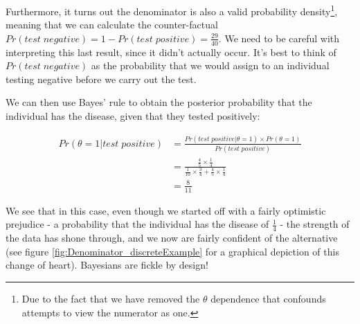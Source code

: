 \documentclass[11pt,fullpage]{book}
\begin{document}
Furthermore, it turns out the denominator is also a valid probability density\footnote{Due to the fact that we have removed the $\theta$ dependence that confounds attempts to view the numerator as one.}, meaning that we can calculate the counter-factual $Pr(test\; negative) = 1 - Pr(test\; positive) = \frac{29}{40}$. We need to be careful with interpreting this last result, since it didn't actually occur. It's best to think of $Pr(test\; negative)$ as the probability that we would assign to an individual testing negative before we carry out the test.

We can then use Bayes' rule to obtain the posterior probability that the individual has the disease, given that they tested positively:

\begin{align}\label{eq:Denominator_discreteExamplePosterior}
Pr(\theta=1|test\; positive) &= \frac{Pr(test\; positive|\theta=1)\times Pr(\theta=1)}{Pr(test\; positive)}\\
&= \frac{\frac{4}{5} \times \frac{1}{4}}{\frac{1}{10} \times \frac{3}{4} + \frac{4}{5} \times \frac{1}{4}}\\
&= \frac{8}{11}
\end{align}

We see that in this case, even though we started off with a fairly optimistic prejudice - a probability that the individual has the disease of $\frac{1}{4}$ - the strength of the data has shone through, and we now are fairly confident of the alternative (see figure \ref{fig:Denominator_discreteExample} for a graphical depiction of this change of heart). Bayesians are fickle by design!
\end{document}
